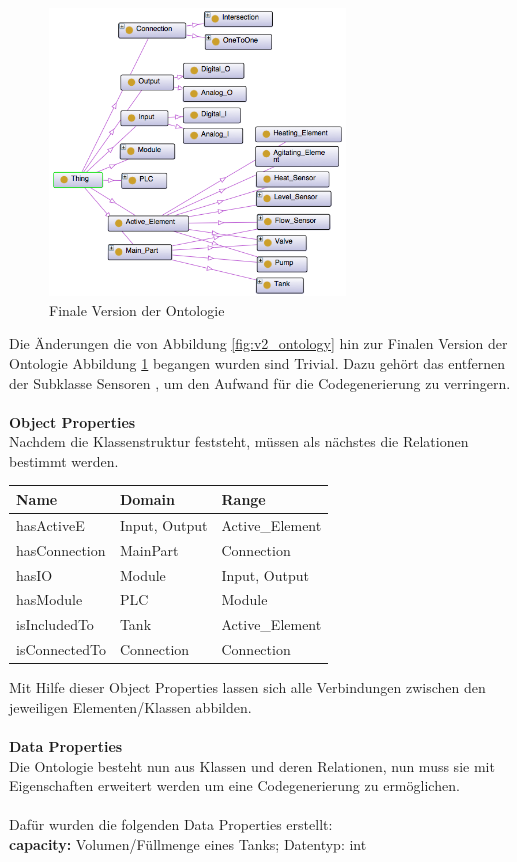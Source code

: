 \begin{figure}[hbt!]
  \centering
  \includegraphics[width=0.7\textwidth]{graphics/implementation/Ontology_final}
  \caption{Finale Version der Ontologie}
  \label{fig:final_ontology}
\end{figure}
Die Änderungen die von Abbildung \ref{fig:v2_ontology} hin zur Finalen Version der Ontologie Abbildung \ref{fig:final_ontology} begangen wurden sind Trivial. Dazu gehört das entfernen der Subklasse \glqq Sensoren \grqq\space, um den Aufwand für die Codegenerierung zu verringern.\\
\\
\textbf{Object Properties}\\
Nachdem die Klassenstruktur feststeht, müssen als nächstes die Relationen bestimmt werden.
\begin{table}[h]
\centering
\begin{tabular}{l|l|l}
\textbf{Name} & \textbf{Domain} & \textbf{Range} \\ \hline
hasActiveE    & Input, Output   & Active\_Element \\ \hline
hasConnection & MainPart        & Connection      \\ \hline
hasIO         & Module          & Input, Output   \\ \hline
hasModule     & PLC             & Module          \\ \hline
isIncludedTo  & Tank            & Active\_Element \\ \hline
isConnectedTo & Connection      & Connection                            
\end{tabular}
\end{table}
Mit Hilfe dieser Object Properties lassen sich alle Verbindungen zwischen den jeweiligen Elementen/Klassen abbilden.\\
\\
\textbf{Data Properties}\\
Die Ontologie besteht nun aus Klassen und deren Relationen, nun muss sie mit Eigenschaften erweitert werden um eine Codegenerierung zu ermöglichen.\\
\\
Dafür wurden die folgenden Data Properties erstellt:\\
\textbf{capacity: }Volumen/Füllmenge eines Tanks; Datentyp: int\\

